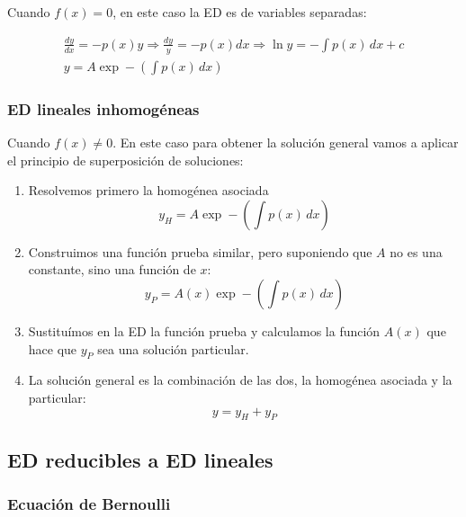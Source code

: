 \documentclass[a4paper,12pt,titlepage]{article}
\begin{document}
Cuando $f(x)=0$, en este caso la ED es de variables separadas:

\begin{equation*}
    \begin{gathered}
    \frac{dy}{dx} = -p(x)y \Rightarrow \frac{dy}{y} = -p(x)dx \Rightarrow \ln y = -\int p(x)\,dx + c \\ y = A \exp -\left (\int p(x)\, dx\right )
    \end{gathered}
\end{equation*}

\subsubsection{ED lineales inhomogéneas}

Cuando $f(x)\neq 0$. En este caso para obtener la solución general vamos a aplicar el principio de superposición de soluciones:

\begin{enumerate}
    \item Resolvemos primero la homogénea asociada
    \begin{equation*}
        y_H = A \exp -\left (\int p(x)\, dx\right )
    \end{equation*}
    \item Construimos una función prueba similar, pero suponiendo que $A$ no es una constante, sino una función de $x$:
    \begin{equation*}
        y_P = A(x) \exp -\left (\int p(x)\, dx\right )
    \end{equation*}
    \item Sustituímos en la ED la función prueba y calculamos la función $A(x)$ que hace que $y_P$ sea una solución particular.
    \item La solución general es la combinación de las dos, la homogénea asociada y la particular:
    \begin{equation*}
        y = y_H + y_P
    \end{equation*}
\end{enumerate}

\newpage

\subsection{ED reducibles a ED lineales}

\subsubsection{Ecuación de Bernoulli}
\end{document}
